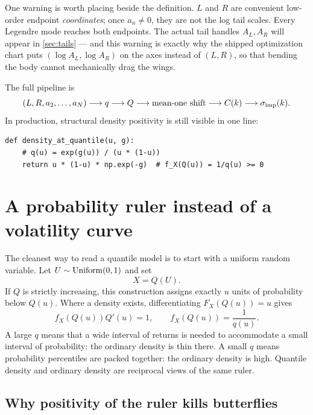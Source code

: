\documentclass[11pt]{article}
\begin{document}
One warning is worth placing beside the definition.  $L$ and $R$ are convenient
low-order endpoint \emph{coordinates}; once $a_n\ne0$, they are not the log tail
scales.  Every Legendre mode reaches both endpoints.  The actual tail handles
$A_L,A_R$ will appear in \cref{sec:tails} --- and this warning is exactly why
the shipped optimization chart puts $(\log A_L,\log A_R)$ on the axes instead
of $(L,R)$, so that bending the body cannot mechanically drag the wings.

The full pipeline is
\[
(L,R,a_2,\ldots,a_N)
\longrightarrow q
\longrightarrow Q
\longrightarrow \text{mean-one shift}
\longrightarrow C(k)
\longrightarrow \sigma_{\rm imp}(k).
\]
In production, structural density positivity is still visible in one line:
\begin{lstlisting}[caption={The non-negative return density, distilled from
\texttt{backend/volfit/models/lqd/quadrature.py}.},
label={lst:density_crux}]
def density_at_quantile(u, g):
    # q(u) = exp(g(u)) / (u * (1-u))
    return u * (1-u) * np.exp(-g)  # f_X(Q(u)) = 1/q(u) >= 0
\end{lstlisting}

\section{A probability ruler instead of a volatility curve}
\label{sec:ruler}

The cleanest way to read a quantile model is to start with a uniform random
variable.  Let $U\sim{\rm Uniform}(0,1)$ and set
\begin{equation}
X=Q(U).
\label{eq:pushforward}
\end{equation}
If $Q$ is strictly increasing, this construction assigns exactly $u$ units of
probability below $Q(u)$.  Where a density exists, differentiating
$F_X(Q(u))=u$ gives
\begin{equation}
f_X(Q(u))Q'(u)=1,\qquad
f_X(Q(u))=\frac{1}{q(u)}.
\label{eq:density_inverse}
\end{equation}
A large $q$ means that a wide interval of returns is needed to accommodate a
small interval of probability: the ordinary density is thin there.  A small
$q$ means probability percentiles are packed together: the ordinary density
is high.  Quantile density and ordinary density are reciprocal views of the
same ruler.

\subsection{Why positivity of the ruler kills butterflies}
\end{document}
